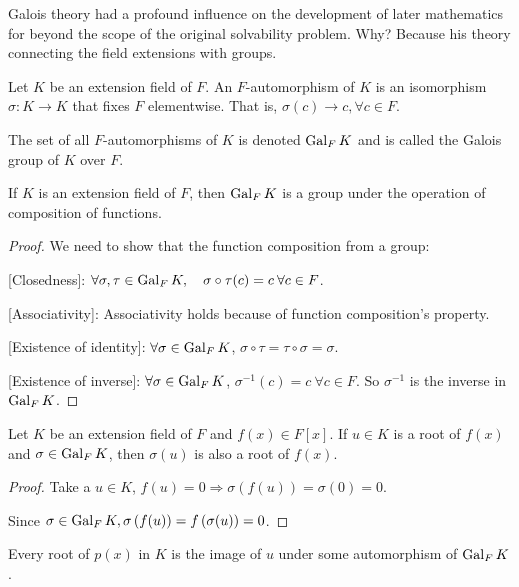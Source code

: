 Galois theory had a profound influence on the development of later mathematics for beyond the scope of 
the original solvability problem. Why? Because his theory connecting the field extensions with groups.

\begin{definition}
    Let $K$ be an extension field of $F$. An $F$-automorphism of $K$ is an isomorphism $\sigma : K \to K$ that 
    fixes $F$ elementwise. That is, $\sigma(c) \to c, \forall c \in F$.

    The set of all $F$-automorphisms of $K$ is denoted $\operatorname{Gal}_F K$ and is called the Galois group of $K$ over $F$.
\end{definition}

\begin{theorem}
    If $K$ is an extension field of $F$, then $\operatorname{Gal}_F K$ is a group under the operation 
    of composition of functions.
\end{theorem}
\begin{proof}
    We need to show that the function composition from a group:

    [Closedness]: $\forall \sigma, \tau \in \operatorname{Gal}_F K, \quad \sigma \circ \tau (c) = c \> \forall c \in F$.
    
    [Associativity]: Associativity holds because of function composition's property.
    
    [Existence of identity]: $\forall \sigma \in \operatorname{Gal}_F K$, $\sigma \circ \tau = \tau \circ \sigma = \sigma$.

    [Existence of inverse]: $\forall \sigma \in \operatorname{Gal}_F K$, $\sigma^{-1}(c) = c \> \forall c \in F$. So 
    $\sigma^{-1}$ is the inverse in $\operatorname{Gal}_F K$.
\end{proof}

\begin{theorem}
    Let $K$ be an extension field of $F$ and $f(x) \in F[x]$. If $u \in K$ is a root of $f(x)$ and $\sigma \in \operatorname{Gal}_F K$, 
    then $\sigma(u)$ is also a root of $f(x)$.
\end{theorem}
\begin{proof}
    Take a $u \in K$, $f(u) = 0 \Longrightarrow \sigma(f(u)) = \sigma(0) = 0$. 

    Since $\sigma \in \operatorname{Gal}_F K, \sigma \left( f(u) \right) = f\left( \sigma(u) \right) = 0$.
\end{proof}

\begin{remark}
    Every root of $p(x)$ in $K$ is the image of $u$ under some automorphism of $\operatorname{Gal}_F K$.
\end{remark}

